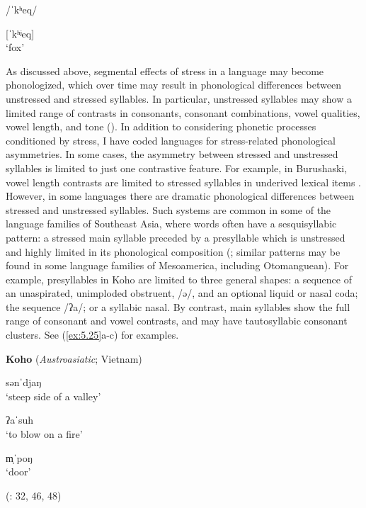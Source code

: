 /ˈkʰeq/

[ˈkʰʲeq]\\
\glt ‘fox’
\citep[23]{Shiraishi2006}
\z

  As discussed above, segmental effects of stress in a language may become phonologized, which over time may result in phonological differences between unstressed and stressed syllables. In particular, unstressed syllables may show a limited range of contrasts in consonants, consonant combinations, vowel qualities, vowel length, and tone (\citealt{vanderHulst2010}). In addition to considering phonetic processes conditioned by stress, I have coded languages for stress-related phonological asymmetries. In some cases, the asymmetry between stressed and unstressed syllables is limited to just one contrastive feature. For example, in Burushaski, vowel length contrasts are limited to stressed syllables in underived lexical items \citep[1028]{Anderson1997}. However, in some languages there are dramatic phonological differences between stressed and unstressed syllables. Such systems are common in some of the language families of Southeast Asia, where words often have a sesquisyllabic pattern: a stressed main syllable preceded by a presyllable which is unstressed and highly limited in its phonological composition (\citealt{Matisoff1973,Michaud2012}; similar patterns may be found in some language families of Mesoamerica, including Otomanguean). For example, presyllables in Koho are limited to three general shapes: a sequence of an unaspirated, unimploded obstruent, /ə/, and an optional liquid or nasal coda; the sequence /ʔa/; or a syllabic nasal. By contrast, main syllables show the full range of consonant and vowel contrasts, and may have tautosyllabic consonant clusters. See (\ref{ex:5.25}a-c) for examples.

\ea\label{ex:5.25}
  \textbf{Koho} (\textit{Austroasiatic}; Vietnam)

\ea  sənˈdjaŋ\\
\glt ‘steep side of a valley’

\ex  ʔaˈsuh\\
\glt ‘to blow on a fire’

\ex  m̩ˈpoŋ\\
\glt ‘door’

(\citealt{Olsen2014}: 32, 46, 48)
\z
\z

